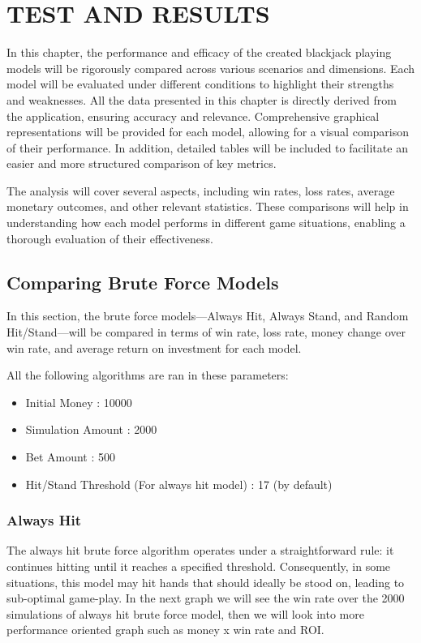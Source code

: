 \documentclass[a4paper,12pt]{report}
\begin{document}
\chapter{TEST AND RESULTS}
\label{test-and-results}
In this chapter, the performance and efficacy of the created blackjack playing models will be rigorously compared across various scenarios and dimensions. Each model will be evaluated under different conditions to highlight their strengths and weaknesses. All the data presented in this chapter is directly derived from the application, ensuring accuracy and relevance. Comprehensive graphical representations will be provided for each model, allowing for a visual comparison of their performance. In addition, detailed tables will be included to facilitate an easier and more structured comparison of key metrics.

The analysis will cover several aspects, including win rates, loss rates, average monetary outcomes, and other relevant statistics. These comparisons will help in understanding how each model performs in different game situations, enabling a thorough evaluation of their effectiveness.

\section{Comparing Brute Force Models}
In this section, the brute force models—Always Hit, Always Stand, and Random Hit/Stand—will be compared in terms of win rate, loss rate, money change over win rate, and average return on investment for each model.


All the following algorithms are ran in these parameters:
\begin{itemize}
    \item Initial Money : 10000
    \item Simulation Amount : 2000
    \item Bet Amount : 500
    \item Hit/Stand Threshold (For always hit model) : 17 (by default)
\end{itemize}

\subsection{Always Hit}

The always hit brute force algorithm operates under a straightforward rule: it continues hitting until it reaches a specified threshold. Consequently, in some situations, this model may hit hands that should ideally be stood on, leading to sub-optimal game-play. In the next graph we will see the win rate over the 2000 simulations of always hit brute force model, then we will look into more performance oriented graph such as money x win rate and ROI.
\end{document}
